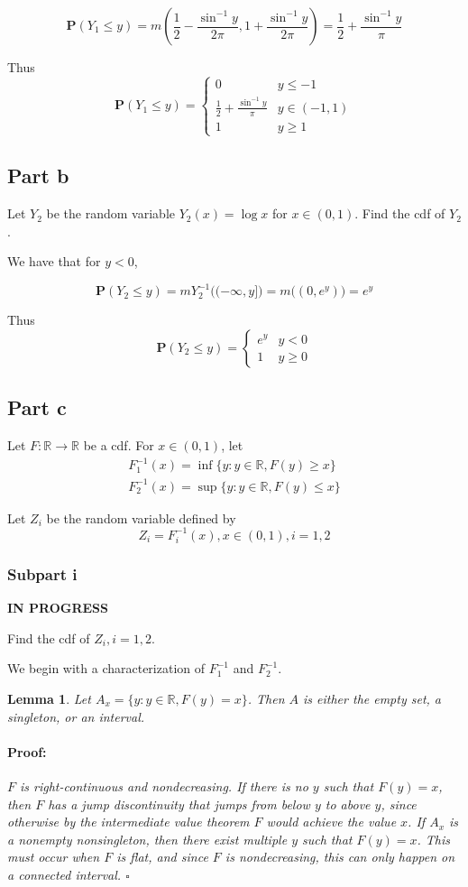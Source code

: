 \documentclass{article}
\newenvironment{proof}{\paragraph{Proof:}}{\hfill$\square$}
\newtheorem{lemma}[theorem]{Lemma}
\newcommand{\R}{\mathbb{R}}
\newcommand{\prob}{\boldsymbol{P}}
\begin{document}
\[
\prob(Y_1 \leq y) = m\left( \frac{1}{2} - \frac{\sin^{-1}y}{2\pi}, 1 + \frac{\sin^{-1}y}{2\pi} \right) = \frac{1}{2} + \frac{\sin^{-1}y}{\pi}
\]

Thus
\[
\prob(Y_1 \leq y) =
\begin{cases}
0 & y \leq -1 \\
\frac{1}{2} + \frac{\sin^{-1}y}{\pi} & y \in (-1, 1) \\
1 & y \geq 1
\end{cases}
\]

\subsection*{Part b}

Let $Y_2$ be the random variable $Y_2(x) = \log x$ for $x \in (0, 1)$. Find the cdf of $Y_2$.

We have that for $y < 0$,

\[
\prob(Y_2 \leq y) = mY_2^{-1}\bigl( (-\infty, y] \bigl) = m\bigl( (0, e^y) \bigl) = e^y
\]

Thus
\[
\prob(Y_2 \leq y) =
\begin{cases}
e^y & y < 0 \\
1 & y \geq 0
\end{cases}
\]

\subsection*{Part c}

Let $F: \R \rightarrow \R$ be a cdf. For $x \in (0, 1)$, let
\begin{gather*}
F_1^{-1}(x) = \inf\{ y: y \in \R, F(y) \geq x\} \\
F_2^{-1}(x) = \sup\{ y: y \in \R, F(y) \leq x\}
\end{gather*}

Let $Z_i$ be the random variable defined by
\[
Z_i = F_i^{-1}(x), x \in (0, 1), i = 1, 2
\]
\subsubsection*{Subpart i}

\textbf{IN PROGRESS}

Find the cdf of $Z_i, i = 1, 2$.

We begin with a characterization of $F_1^{-1}$ and $F_2^{-1}$.

\begin{lemma}
Let $A_x = \{ y: y \in \R, F(y) = x \}$. Then $A$ is either the empty set, a singleton, or an interval.
\begin{proof}
$F$ is right-continuous and nondecreasing. If there is no $y$ such that $F(y) = x$, then $F$ has a jump discontinuity that jumps from below $y$ to above $y$, since otherwise by the intermediate value theorem $F$ would achieve the value $x$. If $A_x$ is a nonempty nonsingleton, then there exist multiple $y$ such that $F(y) = x$. This must occur when $F$ is flat, and since $F$ is nondecreasing, this can only happen on a connected interval.
\end{proof}
\end{lemma}
\end{document}
